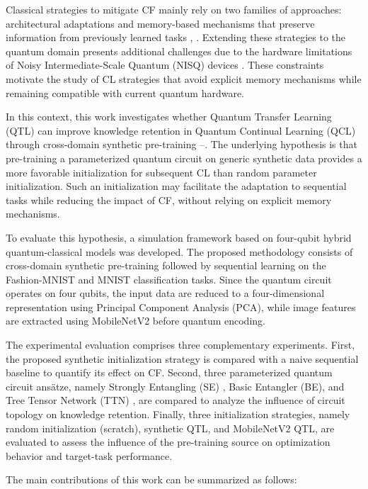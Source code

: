 \documentclass[conference]{IEEEtran}
\begin{document}
Classical strategies to mitigate CF mainly rely on two families of approaches: architectural adaptations and memory-based mechanisms that preserve information from previously learned tasks \cite{b4}, \cite{b5}. Extending these strategies to the quantum domain presents additional challenges due to the hardware limitations of Noisy Intermediate-Scale Quantum (NISQ) devices \cite{b6}. These constraints motivate the study of CL strategies that avoid explicit memory mechanisms while remaining compatible with current quantum hardware.

In this context, this work investigates whether Quantum Transfer Learning (QTL) \cite{b7} can improve knowledge retention in Quantum Continual Learning (QCL) through cross-domain synthetic pre-training \cite{b8}--\cite{b10}. The underlying hypothesis is that pre-training a parameterized quantum circuit on generic synthetic data provides a more favorable initialization for subsequent CL than random parameter initialization. Such an initialization may facilitate the adaptation to sequential tasks while reducing the impact of CF, without relying on explicit memory mechanisms.

To evaluate this hypothesis, a simulation framework based on four-qubit hybrid quantum-classical models was developed. The proposed methodology consists of cross-domain synthetic pre-training followed by sequential learning on the Fashion-MNIST \cite{b11} and MNIST \cite{b12} classification tasks. Since the quantum circuit operates on four qubits, the input data are reduced to a four-dimensional representation using Principal Component Analysis (PCA), while image features are extracted using MobileNetV2 \cite{b13} before quantum encoding.

The experimental evaluation comprises three complementary experiments. First, the proposed synthetic initialization strategy is compared with a naive sequential baseline to quantify its effect on CF. Second, three parameterized quantum circuit ans\"atze, namely Strongly Entangling (SE) \cite{b14}, Basic Entangler (BE), and Tree Tensor Network (TTN) \cite{b15}, are compared to analyze the influence of circuit topology on knowledge retention. Finally, three initialization strategies, namely random initialization (scratch), synthetic QTL, and MobileNetV2 QTL, are evaluated to assess the influence of the pre-training source on optimization behavior and target-task performance.

The main contributions of this work can be summarized as follows:
\end{document}
